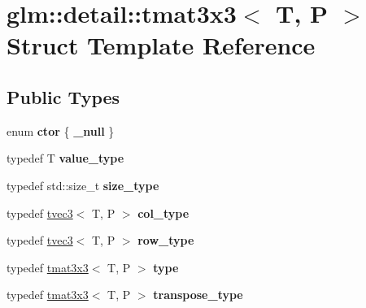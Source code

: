\hypertarget{structglm_1_1detail_1_1tmat3x3}{}\section{glm\+:\+:detail\+:\+:tmat3x3$<$ T, P $>$ Struct Template Reference}
\label{structglm_1_1detail_1_1tmat3x3}
\subsection*{Public Types}
\begin{DoxyCompactItemize}
\item 
enum {\bfseries ctor} \{ {\bfseries \+\_\+null}
 \}\hypertarget{structglm_1_1detail_1_1tmat3x3_a24175afa829b47d3cc2a65860b16e103}{}\label{structglm_1_1detail_1_1tmat3x3_a24175afa829b47d3cc2a65860b16e103}

\item 
typedef T {\bfseries value\+\_\+type}\hypertarget{structglm_1_1detail_1_1tmat3x3_a42b16ee1a345e9626c90ff078ec056b4}{}\label{structglm_1_1detail_1_1tmat3x3_a42b16ee1a345e9626c90ff078ec056b4}

\item 
typedef std\+::size\+\_\+t {\bfseries size\+\_\+type}\hypertarget{structglm_1_1detail_1_1tmat3x3_ac2c45ac2aeb10c76e17a54cae3652819}{}\label{structglm_1_1detail_1_1tmat3x3_ac2c45ac2aeb10c76e17a54cae3652819}

\item 
typedef \hyperlink{structglm_1_1detail_1_1tvec3}{tvec3}$<$ T, P $>$ {\bfseries col\+\_\+type}\hypertarget{structglm_1_1detail_1_1tmat3x3_ad47f3a11bd4333d1103bfa93a86fa54f}{}\label{structglm_1_1detail_1_1tmat3x3_ad47f3a11bd4333d1103bfa93a86fa54f}

\item 
typedef \hyperlink{structglm_1_1detail_1_1tvec3}{tvec3}$<$ T, P $>$ {\bfseries row\+\_\+type}\hypertarget{structglm_1_1detail_1_1tmat3x3_ad963d0adf30cc0c48a2c4166d8fa93b9}{}\label{structglm_1_1detail_1_1tmat3x3_ad963d0adf30cc0c48a2c4166d8fa93b9}

\item 
typedef \hyperlink{structglm_1_1detail_1_1tmat3x3}{tmat3x3}$<$ T, P $>$ {\bfseries type}\hypertarget{structglm_1_1detail_1_1tmat3x3_a8da2644146b18508927325b04c3a9170}{}\label{structglm_1_1detail_1_1tmat3x3_a8da2644146b18508927325b04c3a9170}

\item 
typedef \hyperlink{structglm_1_1detail_1_1tmat3x3}{tmat3x3}$<$ T, P $>$ {\bfseries transpose\+\_\+type}\hypertarget{structglm_1_1detail_1_1tmat3x3_a3ecde8b3a849d43a5aefed5f542c041f}{}\label{structglm_1_1detail_1_1tmat3x3_a3ecde8b3a849d43a5aefed5f542c041f}

\end{DoxyCompactItemize}
